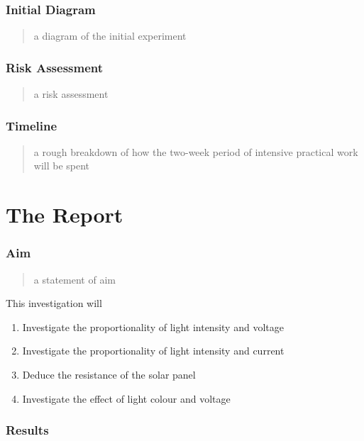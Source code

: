 \documentclass{article}
\begin{document}
\section{Initial Diagram}
\begin{quote}
a diagram of the initial experiment
\end{quote}
\section{Risk Assessment}
\begin{quote}
a risk assessment
\end{quote}

\section{Timeline}
\begin{quote}
a rough breakdown of how the two-week period of intensive practical work will be spent
\end{quote}
\pagebreak [4]
\part{The Report}

\section{Aim}
\begin{quote}
  a statement of aim
\end{quote}
This investigation will
\begin{enumerate}
  \item Investigate the proportionality of light intensity and voltage
  \item Investigate the proportionality of light intensity and current
  \item Deduce the resistance of the solar panel
  \item Investigate the effect of light colour and voltage
\end{enumerate}

\section{Results}
\end{document}
